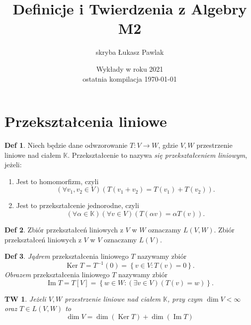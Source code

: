 \documentclass[a4paper, 12pt]{mwart}
\author{skryba Łukasz Pawlak}
\title{Definicje i Twierdzenia z Algebry M2}
\date{Wykłady w roku 2021 \\ ostatnia kompilacja \today}
\DeclareMathOperator{\Ima}{Im}
\DeclareMathOperator{\Ker}{Ker}
\theoremstyle{definition}
\newtheorem{definicja}{Def}[section]
\theoremstyle{plain}
\newtheorem{twierdzenie}{TW}[section]
\theoremstyle{remark}
\begin{document}
\maketitle
\section{Przekształcenia liniowe}
\begin{definicja}
	Niech będzie dane odwzorowanie $T: V \to W$, gdzie $V, W$ \ppauza przestrzenie liniowe nad ciałem $\mathbb{K}$.
	Przekształcenie to nazywa \emph{się przekształceniem liniowym}, jeżeli:
	\begin{enumerate}
		\item Jest to homomorfizm, czyli
		\begin{equation}
			\left(\forall v_1, v_2 \in V\right)\left(T(v_1 + v_2) = T(v_1) + T(v_2)\right).
		\end{equation}
		\item Jest to przekształcenie jednorodne, czyli
		\begin{equation}
			\left(\forall \alpha \in \mathbb{K}\right)\left(\forall v \in V\right)\left(T(\alpha v) = \alpha T(v)\right).
		\end{equation}
	\end{enumerate}
\end{definicja}
\begin{definicja}
	Zbiór przekształceń liniowych z $V$ w $W$ oznaczamy $L(V, W)$.
	Zbiór przekształceń liniowych z $V$ w $V$ oznaczamy $L(V)$.
\end{definicja}
\begin{definicja}
	\emph{Jądrem} przekształcenia liniowego $T$ nazywamy zbiór
	\begin{equation}
		\Ker T = T^{-1}(0) = \left\{v \in V: T(v) = 0\right\}.
	\end{equation}
	\emph{Obrazem} przekształcenia liniowego $T$ nazywamy zbiór
	\begin{equation}
		\Ima T = T[V] = \left\{w \in W: \left(\exists v \in V\right)\left(T(v) = w\right)\right\}.
	\end{equation}
\end{definicja}
\begin{twierdzenie}
	Jeżeli $V, W$ \ppauza przestrzenie liniowe nad ciałem $\mathbb{K}$, przy czym $\dim V < \infty$ oraz $T \in L(V, W)$ to
	\begin{equation}
		\dim V = \dim (\Ker T) + \dim (\Ima T)
	\end{equation}
\end{twierdzenie}
\end{document}
